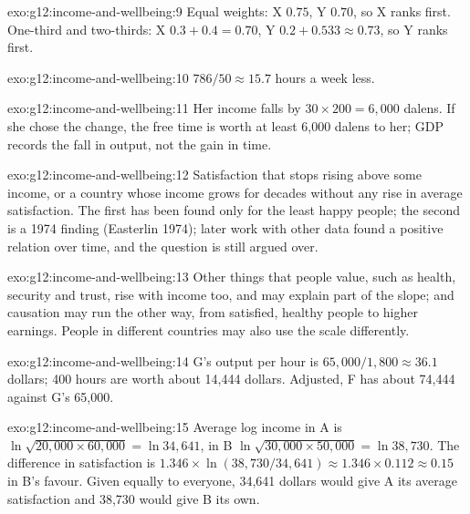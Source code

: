 \begin{solution}{exo:g12:income-and-wellbeing:9}
Equal weights: X $0.75$, Y $0.70$, so X ranks first. One-third and two-thirds: X $0.3 + 0.4 = 0.70$, Y $0.2 + 0.533 \approx 0.73$, so Y ranks first.
\end{solution}

\begin{solution}{exo:g12:income-and-wellbeing:10}
$786/50 \approx 15.7$ hours a week less.
\end{solution}

\begin{solution}{exo:g12:income-and-wellbeing:11}
Her income falls by $30 \times 200 = 6{,}000$ dalens. If she chose the change, the free time is worth at least 6,000 dalens to her; GDP records the fall in output, not the
gain in time.
\end{solution}

\begin{solution}{exo:g12:income-and-wellbeing:12}
Satisfaction that stops rising above some income, or a country whose income grows for decades without any rise in average satisfaction. The first has been found only for
the least happy people; the second is a 1974 finding (Easterlin 1974); later work with other data found a positive relation over time, and the question is still argued over.
\end{solution}

\begin{solution}{exo:g12:income-and-wellbeing:13}
Other things that people value, such as health, security and trust, rise with income too, and may explain part of the slope; and causation may run the other way, from
satisfied, healthy people to higher earnings. People in different countries may also use the scale differently.
\end{solution}

\begin{solution}{exo:g12:income-and-wellbeing:14}
G's output per hour is $65{,}000/1{,}800 \approx 36.1$ dollars; 400 hours are worth about 14,444 dollars. Adjusted, F has about 74,444 against G's 65,000.
\end{solution}

\begin{solution}{exo:g12:income-and-wellbeing:15}
Average log income in A is $\ln\sqrt{20{,}000 \times 60{,}000} = \ln 34{,}641$, in B $\ln\sqrt{30{,}000 \times 50{,}000} = \ln 38{,}730$. The difference in satisfaction is
$1.346 \times \ln(38{,}730/34{,}641) \approx 1.346 \times 0.112 \approx 0.15$ in B's favour. Given equally to everyone, 34,641 dollars would give A its average satisfaction
and 38,730 would give B its own.
\end{solution}

